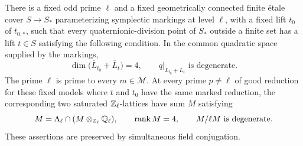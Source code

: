 \begin{proposition}\label{prop:marking}
There is a fixed odd prime $\ell$ and a fixed geometrically connected finite
\'{e}tale cover $S\to S_*$ parameterizing symplectic markings at level $\ell$,
with a fixed lift $t_0$ of $t_{0,*}$, such that every quaternionic-division
point of $S_*$ outside a finite set has a lift $t\in S$ satisfying the
following condition.  In the common quadratic space supplied by the
markings,
\begin{equation}\label{eq:marked-incidence}
 \dim\bigl(\overline L_{t_0}+\overline L_t\bigr)=4,
 \qquad
 q|_{\overline L_{t_0}+\overline L_t}\text{ is degenerate}.
\end{equation}
The prime $\ell$ is prime to every $m\in\mathcal M$.  At every prime
$p\ne\ell$ of good reduction for these fixed models where $t$ and $t_0$
have the same marked reduction, the corresponding two saturated
$\mathbb Z_\ell$-lattices have sum $M$ satisfying
\begin{equation}\label{eq:primitive-four-lattice}
 M=\Lambda_\ell\cap(M\otimes_{\mathbb Z_\ell}\mathbb Q_\ell),
 \qquad \operatorname{rank} M=4,
 \qquad M/\ell M\text{ is degenerate}.
\end{equation}
These assertions are preserved by simultaneous field conjugation.
\end{proposition}

